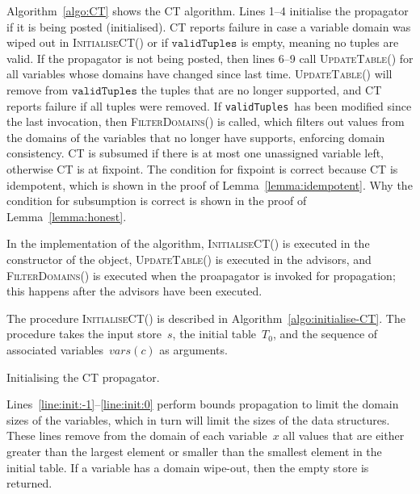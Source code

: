 \documentclass[a4paper,11pt]{article}
\newcommand{\Algoref}[1]{Algorithm~\ref{#1}}
\newcommand{\Linesref}[2]{Lines~\ref{#1}--\ref{#2}}
\newcommand{\CurrTable}{\texttt{validTuples}}
\def\UpdateTable{\textsc{UpdateTable}}
\def\FilterDomains{\textsc{FilterDomains}}
\def\InitialiseCT{\textsc{InitialiseCT}}
\numberwithin{equation}{section}
\begin{document}
\Algoref{algo:CT} shows the CT algorithm. Lines 1--4 initialise the propagator
if it is being posted (initialised). CT reports failure in case a variable domain was
wiped out in \InitialiseCT() or if $\CurrTable$ is empty, meaning no tuples are valid.
If the propagator is not being posted, then
lines 6--9 call \UpdateTable() for all variables whose domains have changed
since last time. \UpdateTable() will remove from $\CurrTable$ the tuples that
are no longer supported, and CT reports failure if all tuples were removed.
If \CurrTable~has been modified since the last invocation, then \FilterDomains() is
called, which filters out values from the domains of the variables that
no longer have supports, enforcing domain consistency.
CT is subsumed if there is at most one unassigned variable
left, otherwise CT is at fixpoint.
The condition for fixpoint is correct because CT is idempotent,
which is shown in the proof of Lemma~\ref{lemma:idempotent}.
Why the condition for subsumption is correct is shown in the proof of 
Lemma~\ref{lemma:honest}.

In the implementation of the algorithm,
\InitialiseCT() is executed in the constructor of the
object, \UpdateTable() is executed in the advisors, and \FilterDomains() is
executed when the proapagator is invoked for propagation; this happens after
the advisors have been executed.



\bigskip

The procedure \InitialiseCT() is described in
\Algoref{algo:initialise-CT}. The procedure takes the
input store~$s$, the 
initial table~$T_0$, and the sequence of associated 
variables~$\mathit{vars}(c)$ as arguments.

\begin{algorithm}[t]
  \begin{algorithmic}[1]  %
    
  \end{algorithmic}
  \caption{Initialising the CT propagator.}
  \label{algo:initialise-CT}
\end{algorithm}

\Linesref{line:init:-1}{line:init:0} perform bounds
  propagation to limit the domain sizes of the variables,
  which in turn will limit the sizes of the data structures.
  These lines remove from the domain of each variable~$x$ all
  values that are either greater 
  than the largest element or smaller than the smallest element in the
  initial table. If a variable has a domain wipe-out,
  then the empty store is returned.
\end{document}
